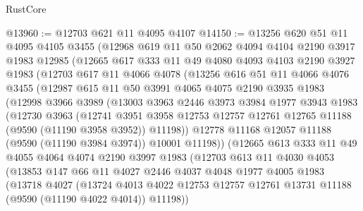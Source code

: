 \begin{lexlean}{RustCore}
\begin{coremodule}
@13960 := @12703 @621 @11 @4095 @4107
@14150 := @13256
    @620
    @51
    @11
    @4095
    @4105
    @3455
    (@12968
      @619
      @11
      @50
      @2062
      @4094
      @4104
      @2190
      @3917
      @1983
      @12985
      (@12665
        @617
        @333
        @11
        @49
        @4080
        @4093
        @4103
        @2190
        @3927
        @1983
        (@12703
          @617
          @11
          @4066
          @4078
          (@13256
            @616
            @51
            @11
            @4066
            @4076
            @3455
            (@12987
              @615
              @11
              @50
              @3991
              @4065
              @4075
              @2190
              @3935
              @1983
              (@12998
                @3966
                @3989
                (@13003
                  @3963
                  @2446
                  @3973
                  @3984
                  @1977
                  @3943
                  @1983
                  (@12730
                    @3963
                    (@12741
                      @3951
                      @3958
                      @12753
                      @12757
                      @12761
                      @12765
                      @11188
                      (@9590 (@11190 @3958 @3952))
                      @11198))
                  @12778
                  @11168
                  @12057
                  @11188
                  (@9590 (@11190 @3984 @3974))
                  @10001
                  @11198))
              (@12665
                @613
                @333
                @11
                @49
                @4055
                @4064
                @4074
                @2190
                @3997
                @1983
                (@12703
                  @613
                  @11
                  @4030
                  @4053
                  (@13853
                    @147
                    @66
                    @11
                    @4027
                    @2446
                    @4037
                    @4048
                    @1977
                    @4005
                    @1983
                    (@13718
                      @4027
                      (@13724
                        @4013
                        @4022
                        @12753
                        @12757
                        @12761
                        @13731
                        @11188
                        (@9590 (@11190 @4022 @4014))
                        @11198))

\end{coremodule}
\end{lexlean}
